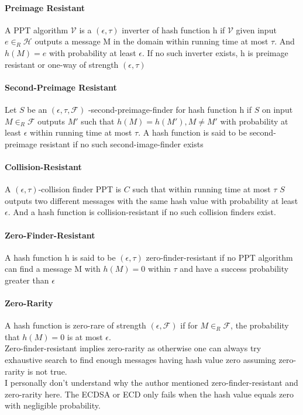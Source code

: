 \documentclass[18]{article}
\begin{document}
\paragraph{Preimage Resistant}
A PPT algorithm $\mathcal{V}$ is a $(\epsilon, \tau)$ inverter of hash function h if $\mathcal{V}$ given input $e \in_R \mathcal{H}$ outputs a message M
in the domain within running time at most $\tau$.
And $h(M)=e$ with probability at least $\epsilon$.
If no such inverter exists, h is preimage resistant or one-way of strength $(\epsilon, \tau)$\\
\paragraph{Second-Preimage Resistant}
Let $S$ be an $(\epsilon, \tau, \mathscr{F})$
-second-preimage-finder for hash function h if $S$ on
input $M\in_R\mathscr{F}$ outputs
$M\prime$ such that $h(M)=h(M\prime), M\neq M\prime$ with probability at least $\epsilon$ within running time at most $\tau$.
A hash function is said to be second-preimage resistant if no such second-image-finder exists\\
\paragraph{Collision-Resistant}
A $(\epsilon, \tau)$-collision finder PPT is $C$ such that within running time at most $\tau$ $S$ outputs two different messages with the same hash value with probability at least $\epsilon$. And a hash function is collision-resistant if no such collision finders exist.
\paragraph{Zero-Finder-Resistant}
A hash function h is said to be $(\epsilon, \tau)$ zero-finder-resistant if no PPT algorithm can find a message M with $h(M)=0$ within
$\tau$ and have a success probability greater than $\epsilon$
\paragraph{Zero-Rarity}
A hash function is zero-rare of strength $(\epsilon, \mathscr{F})$ if for $M\in _R \mathscr{F}$, the probability that $h(M)=0$ is at most $\epsilon$.
\\ Zero-finder-resistant implies zero-rarity as otherwise one can always try exhaustive search to find enough messages having hash value zero assuming zero-rarity is not true.
\\ I personally don't understand why the author mentioned zero-finder-resistant and zero-rarity here. The ECDSA or ECD only fails when the hash value equals zero with negligible probability.
\end{document}
